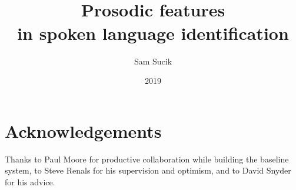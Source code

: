 \documentclass[bsc,frontabs,twoside,singlespacing,parskip,deptreport]{infthesis}
\begin{document}
\title{\vspace{-5.0cm}  \vspace{1cm} \\ Prosodic features \\in spoken language identification}

\author{Sam Sucik}

\project{\vspace{3cm}{\bf MInf Project (Part 1) Report}}

\date{2019}


\maketitle

\section*{Acknowledgements}{
  Thanks to Paul Moore for productive collaboration while building the baseline system, to Steve Renals for his supervision and optimism, and to David Snyder for his advice.
}

\tableofcontents

\end{document}
